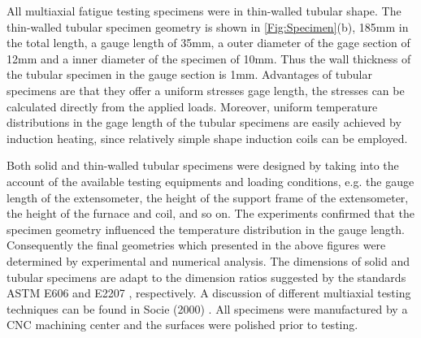 All multiaxial fatigue testing specimens were in thin-walled tubular shape.
The thin-walled tubular specimen geometry is shown in \ref{Fig:Specimen}(b), 185mm in the total length, a gauge length of 35mm, a outer diameter of the gage section of 12mm and a inner diameter of the specimen of 10mm.
Thus the wall thickness of the tubular specimen in the gauge section is 1mm.
Advantages of tubular specimens are that they offer a uniform stresses gage length, the stresses can be calculated directly from the applied loads.
Moreover, uniform temperature distributions in the gage length of the tubular specimens are easily achieved by induction heating, since relatively simple shape induction coils can be employed.

Both solid and thin-walled tubular specimens were designed by taking into the account of the available testing equipments and loading conditions, e.g. the gauge length of the extensometer, the height of the support frame of the extensometer, the height of the furnace and coil, and so on.
The experiments confirmed that the specimen geometry influenced the temperature distribution in the gauge length.
Consequently the final geometries which presented in the above figures were determined by experimental and numerical analysis.
The dimensions of solid and tubular specimens are adapt to the dimension ratios suggested by the standards ASTM E606 \cite{astm1998standard} and E2207 \cite{standard2007e2207}, respectively.
A discussion of different multiaxial testing techniques can be found in Socie (2000) \cite{socie2000multiaxial}.
All specimens were manufactured by a CNC machining center and the surfaces were polished prior to testing.




